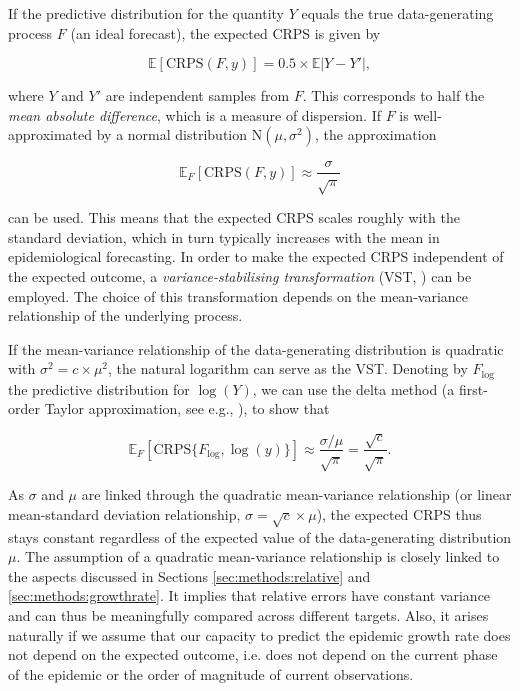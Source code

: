\documentclass[10pt,letterpaper]{article}
\begin{document}
If the predictive distribution for the quantity $Y$ equals the true data-generating process $F$ (an ideal forecast), the expected CRPS is given by \cite{gneitingStrictlyProperScoring2007}
\begin{linenomath*}
\begin{equation}
\mathbb{E}[\text{CRPS}(F, y)] = 0.5\times\mathbb{E}|Y - Y'|,
\end{equation}
\end{linenomath*}
where $Y$ and $Y'$ are independent samples from $F$. This corresponds to half the \textit{mean absolute difference}, which is a measure of dispersion. If $F$ is well-approximated by a normal distribution $\text{N}(\mu, \sigma^2)$, the approximation
\begin{linenomath*}
\begin{equation}
\mathbb{E}_F[\text{CRPS}(F, y)] \approx \frac{\sigma}{\sqrt{\pi}}
\end{equation}
\end{linenomath*}
can be used. This means that the expected CRPS scales roughly with the standard deviation, which in turn typically increases with the mean in epidemiological forecasting. In order to make the expected CRPS independent of the expected outcome, a \textit{variance-stabilising transformation} (VST, \cite{bartlettSquareRootTransformation1936, dunnGeneralizedLinearModels2018}) can be employed. The choice of this transformation depends on the mean-variance relationship of the underlying process. 

If the mean-variance relationship of the data-generating distribution is quadratic with $\sigma^2 = c \times \mu^2$, the natural logarithm can serve as the VST. Denoting by $F_{\log}$ the predictive distribution for $\log(Y)$, we can use the delta method (a first-order Taylor approximation, see e.g., \cite{dunnGeneralizedLinearModels2018}), to show that

\begin{linenomath*}
\begin{equation}
\mathbb{E}_F[\text{CRPS}\{F_{\log}, \log(y)\}] \approx \frac{\sigma/\mu}{\sqrt{\pi}} 
= \frac{\sqrt{c}}{\sqrt{\pi}}
.\label{eq:taylor_quadratic}
\end{equation}
\end{linenomath*}
As $\sigma$ and $\mu$ are linked through the quadratic mean-variance relationship (or linear mean-standard deviation relationship, $\sigma = \sqrt{c} \times \mu$), the expected CRPS thus stays constant regardless of the expected value of the data-generating distribution $\mu$. The assumption of a quadratic mean-variance relationship is closely linked to the aspects discussed in Sections \ref{sec:methods:relative} and \ref{sec:methods:growthrate}. It implies that relative errors have constant variance and can thus be meaningfully compared across different targets. Also, it arises naturally if we assume that our capacity to predict the epidemic growth rate does not depend on the expected outcome, i.e. does not depend on the current phase of the epidemic or the order of magnitude of current observations.
\end{document}
